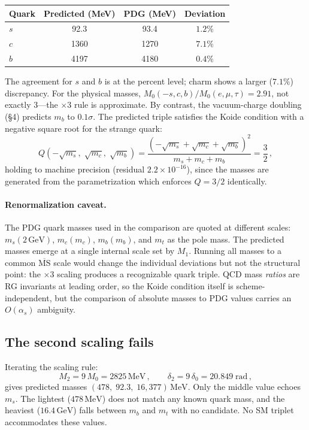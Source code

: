 \documentclass[12pt,a4paper]{article}
\newcommand{\MeV}{\,\text{MeV}}
\newcommand{\GeV}{\,\text{GeV}}
\begin{document}
\begin{center}
\begin{tabular}{lccc}
\toprule
Quark & Predicted (MeV) & PDG (MeV) & Deviation \\
\midrule
$s$ & 92.3 & 93.4 & $1.2\%$ \\
$c$ & 1360 & 1270 & $7.1\%$ \\
$b$ & 4197 & 4180 & $0.4\%$ \\
\bottomrule
\end{tabular}
\end{center}

The agreement for $s$ and $b$ is at the percent level; charm shows a
larger ($7.1\%$) discrepancy. For the physical masses,
$M_0(-s,c,b)/M_0(e,\mu,\tau) = 2.91$, not exactly $3$---the
$\times 3$ rule is approximate. By contrast, the vacuum-charge
doubling (\S4) predicts $m_b$ to $0.1\sigma$.
The predicted triple satisfies the
Koide condition with a negative square root for the strange quark:
\begin{equation}
Q(-\sqrt{m_s},\;\sqrt{m_c},\;\sqrt{m_b})
= \frac{(-\sqrt{m_s} + \sqrt{m_c} + \sqrt{m_b})^2}{m_s + m_c + m_b}
= \frac{3}{2}\,,
\end{equation}
holding to machine precision (residual $2.2 \times 10^{-16}$), since
the masses are generated from the parametrization which
enforces $Q = 3/2$ identically.

\paragraph{Renormalization caveat.}
The PDG quark masses used in the comparison are quoted at different
scales: $m_s(2\GeV)$, $m_c(m_c)$, $m_b(m_b)$, and $m_t$ as the pole
mass. The predicted masses emerge at a single internal scale set by
$M_1$. Running all masses to a common $\overline{\text{MS}}$ scale
would change the individual deviations but
not the structural point: the $\times 3$ scaling produces a
recognizable quark triple. QCD mass \emph{ratios} are RG invariants
at leading order, so the Koide condition itself is scheme-independent,
but the comparison of absolute masses to PDG values carries an
$O(\alpha_s)$ ambiguity.

\subsection{The second scaling fails}
Iterating the scaling rule:
\begin{equation}
M_2 = 9\,M_0 = 2825\MeV\,, \qquad
\delta_2 = 9\,\delta_0 = 20.849\;\text{rad}\,,
\end{equation}
gives predicted masses $(478,\; 92.3,\; 16{,}377)\MeV$. Only the
middle value echoes $m_s$. The lightest ($478\MeV$) does not match
any known quark mass, and the heaviest ($16.4\GeV$) falls between
$m_b$ and $m_t$ with no candidate. No SM triplet accommodates these
values.
\end{document}
